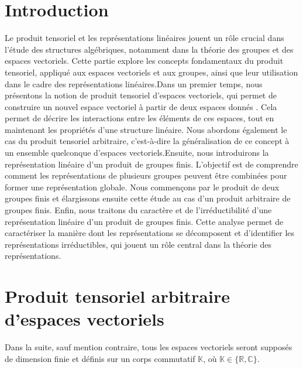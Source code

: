 \documentclass[a4paper, 14pt]{report}
\begin{document}
\begin{onehalfspace}
{\section*{Introduction}
Le produit tensoriel et les représentations linéaires jouent un rôle crucial dans l'étude des structures algébriques, notamment dans la théorie des groupes et des espaces vectoriels. Cette partie explore les concepts fondamentaux du produit tensoriel, appliqué aux espaces vectoriels et aux groupes, ainsi que leur utilisation dans le cadre des représentations linéaires.Dans un premier temps, nous présentons la notion de produit tensoriel d’espaces vectoriels, qui permet de construire un nouvel espace vectoriel à partir de deux espaces donnés \cite{greub2012linear}. Cela permet de décrire les interactions entre les éléments de ces espaces, tout en maintenant les propriétés d'une structure linéaire. Nous abordons également le cas du produit tensoriel arbitraire, c'est-à-dire la généralisation de ce concept à un ensemble quelconque d'espaces vectoriels.Ensuite, nous introduirons la représentation linéaire d’un produit de groupes finis. L'objectif est de comprendre comment les représentations de plusieurs groupes peuvent être combinées pour former une représentation globale. Nous commençons par le produit de deux groupes finis \cite{serre1971representation} et élargissons ensuite cette étude au cas d'un produit arbitraire de groupes finis. Enfin, nous traitons du caractère et de l’irréductibilité d’une représentation linéaire d’un produit de groupes finis. Cette analyse permet de caractériser la manière dont les représentations se décomposent et d'identifier les représentations irréductibles, qui jouent un rôle central dans la théorie des représentations.


\newpage

\section{Produit tensoriel arbitraire d'espaces vectoriels}
Dans la suite, sauf mention contraire, tous les espaces vectoriels seront supposés de dimension finie et définis sur un corps commutatif \( \mathbb{K} \), où \( \mathbb{K} \in \{ \mathbb{R}, \mathbb{C} \} \).

}
\end{onehalfspace}
\end{document}
